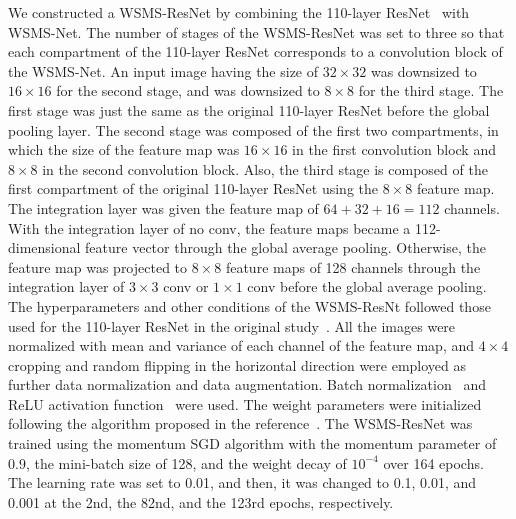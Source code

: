 \documentclass[journal]{IEEEtran}
\begin{document}
We constructed a WSMS-ResNet by combining the 110-layer ResNet~\cite{He2017} with WSMS-Net.
The number of stages of the WSMS-ResNet was set to three so that each compartment of the 110-layer ResNet corresponds to a convolution block of the WSMS-Net.
An input image having the size of $32\times32$ was downsized to $16\times16$ for the second stage, and was downsized to $8\times8$ for the third stage.
The first stage was just the same as the original 110-layer ResNet before the global pooling layer.
The second stage was composed of the first two compartments, in which the size of the feature map was $16\times16$ in the first convolution block and $8\times8$ in the second convolution block.
Also, the third stage is composed of the first compartment of the original 110-layer ResNet using the $8\times8$ feature map.
The integration layer was given the feature map of $64+32+16=112$ channels.
With the integration layer of no conv, the feature maps became a 112-dimensional feature vector through the global average pooling.
Otherwise, the feature map was projected to $8\times8$ feature maps of 128 channels through the integration layer of $3\times3$ conv or $1\times1$ conv before the global average pooling.
The hyperparameters and other conditions of the WSMS-ResNt followed those used for the 110-layer ResNet in the original study~\cite{He2017}.
All the images were normalized with mean and variance of each channel of the feature map, and $4\times4$ cropping and random flipping in the horizontal direction were employed as further data normalization and data augmentation.
Batch normalization~\cite{Ioffe2015} and ReLU activation function~\cite{Nair2010} were used.
The weight parameters were initialized following the algorithm proposed in the reference~\cite{He2016a}.
The WSMS-ResNet was trained using the momentum SGD algorithm with the momentum parameter of 0.9, the mini-batch size of 128, and the weight decay of $10^{-4}$ over 164 epochs.
The learning rate was set to 0.01, and then, it was changed to 0.1, 0.01, and 0.001 at the 2nd, the 82nd, and the 123rd epochs, respectively.
\end{document}
